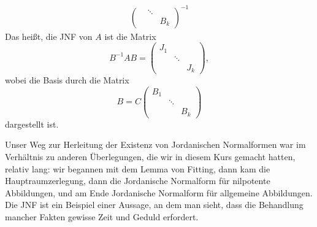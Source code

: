 \begin{bem}
\begin{enumerate}
\begin{align*}
\begin{pmatrix}
				& \ddots & \\
				&& B_k
			\end{pmatrix}^{-1}
		\end{align*}
		Das heißt, die JNF von $A$ ist die Matrix 
		\[ B^{-1}AB = \begin{pmatrix}
			J_1 && \\
			& \ddots & \\
			&& J_k
		\end{pmatrix},
		\]
		wobei die Basis durch die Matrix 
		\[ B = C \begin{pmatrix}
			B_1 && \\
			& \ddots & \\
			&& B_k
		\end{pmatrix} \]
		dargestellt ist. 
	\end{enumerate}
\end{bem}

\begin{bem}
	Unser Weg zur Herleitung der Existenz von Jordanischen Normalformen war im Verhältnis zu anderen Überlegungen, die wir in diesem Kurs gemacht hatten, relativ lang: wir begannen mit dem Lemma von Fitting, dann kam die Hauptraumzerlegung, dann die Jordanische Normalform für nilpotente Abbildungen, und am Ende Jordanische Normalform für allgemeine Abbildungen. Die JNF ist ein Beispiel einer Aussage, an dem man sieht, dass die Behandlung mancher Fakten gewisse Zeit und Geduld erfordert.
\end{bem} 
